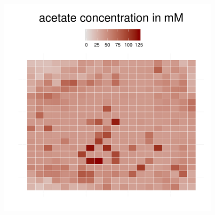 \begin{figure}[h!]
{\begin{minipage}[t]{0.3\textwidth}
  \end{minipage}
  \begin{minipage}[t]{0.3\textwidth}
    \includegraphics[width=\textwidth]{../results/Bcoli_20x20_seed176_ace35a.pdf}
  \end{minipage}
  }
\end{figure}
